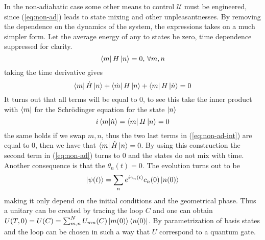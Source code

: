 In the non-adiabatic case some other means to control $\mathcal{U}$ must be engineered, since (\ref{eq:non-ad}) leads to state mixing and other unpleasantnesses. By removing the dependence on the dynamics of the system, the expressions takes on a much simpler form. 
Let the average energy of any to states be zero\cite{NHQC}, time dependence suppressed for clarity.
\begin{equation}
\bra{m}H\ket{n} = 0,\,\forall m,n
\end{equation} 
taking the time derivative gives 
\begin{equation}
\label{eq:non-ad-int}
\bra{m}\dot{H}\ket{n} + \bra{\dot{m}}H\ket{n} + \bra{m}H\ket{\dot{n}} = 0
\end{equation}
It turns out that all terms will be equal to 0, to see this 
take the inner product with $\bra{m}$ for the Schrödinger equation for the state $\ket{n}$
\begin{equation}
i\bra{m}\ket{\dot{n}} = \bra{m}H\ket{n} = 0
\end{equation}
the same holds if we swap $m,n$, thus the two last terms in (\ref{eq:non-ad-int}) are equal to 0, then we have that $\bra{m}\dot{H}\ket{n} = 0$. By using this construction the second term in (\ref{eq:non-ad}) turns to 0 and the states do not mix with time. Another consequence is that the $\theta_n(t)= 0$. The evolution turns out to be 
\begin{equation}
\ket{\psi(t)} = \sum_{n}e^{i\gamma_n(t)}c_n(0)\ket{n(0)}
\end{equation}
making it only depend on the initial conditions and the geometrical phase.
Thus a unitary can be created by tracing the loop $C$ and one can obtain $U(T,0) = U(C) = \sum_{m,n}^N U_{mn}(C)\ket{m(0)}\bra{n(0)}$.
By parametrization of basis states and the loop can be chosen in such a way that $U$ correspond to a quantum gate.
